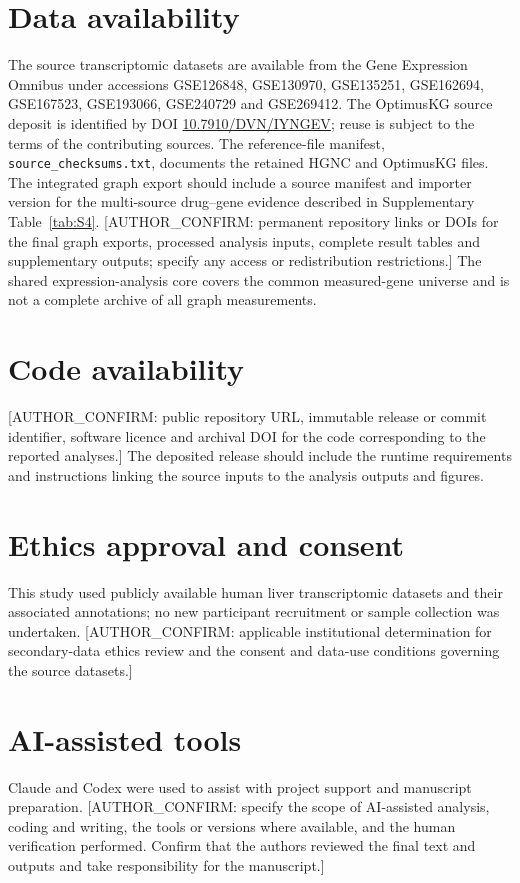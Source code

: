 \documentclass[11pt,a4paper]{article}
\begin{document}
\section*{Data availability}
The source transcriptomic datasets are available from the Gene Expression Omnibus under accessions GSE126848, GSE130970, GSE135251, GSE162694, GSE167523, GSE193066, GSE240729 and GSE269412. The OptimusKG source deposit is identified by DOI \href{https://doi.org/10.7910/DVN/IYNGEV}{10.7910/DVN/IYNGEV}; reuse is subject to the terms of the contributing sources. The reference-file manifest, \nolinkurl{source_checksums.txt}, documents the retained HGNC and OptimusKG files. The integrated graph export should include a source manifest and importer version for the multi-source drug--gene evidence described in Supplementary Table~\ref{tab:S4}. [AUTHOR\_CONFIRM: permanent repository links or DOIs for the final graph exports, processed analysis inputs, complete result tables and supplementary outputs; specify any access or redistribution restrictions.] The shared expression-analysis core covers the common measured-gene universe and is not a complete archive of all graph measurements.

\section*{Code availability}
[AUTHOR\_CONFIRM: public repository URL, immutable release or commit identifier, software licence and archival DOI for the code corresponding to the reported analyses.] The deposited release should include the runtime requirements and instructions linking the source inputs to the analysis outputs and figures.

\section*{Ethics approval and consent}
This study used publicly available human liver transcriptomic datasets and their associated annotations; no new participant recruitment or sample collection was undertaken. [AUTHOR\_CONFIRM: applicable institutional determination for secondary-data ethics review and the consent and data-use conditions governing the source datasets.]

\section*{AI-assisted tools}
Claude and Codex were used to assist with project support and manuscript preparation. [AUTHOR\_CONFIRM: specify the scope of AI-assisted analysis, coding and writing, the tools or versions where available, and the human verification performed. Confirm that the authors reviewed the final text and outputs and take responsibility for the manuscript.]
\end{document}
